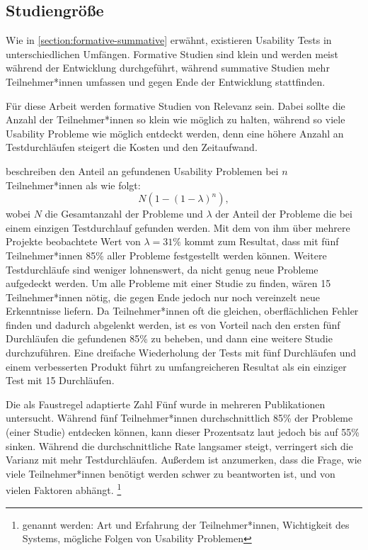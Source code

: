 \subsection{Studiengröße}
\label{section:study-size}

Wie in \ref{section:formative-summative} erwähnt, existieren Usability Tests in unterschiedlichen
Umfängen. Formative Studien sind klein und werden meist während der Entwicklung durchgeführt,
während summative Studien mehr Teilnehmer*innen umfassen und gegen Ende der Entwicklung stattfinden.

Für diese Arbeit werden formative Studien von Relevanz sein. Dabei sollte die Anzahl der
Teilnehmer*innen so klein wie möglich zu halten, während so viele Usability Probleme wie möglich
entdeckt werden, denn eine höhere Anzahl an Testdurchläufen steigert die Kosten und den Zeitaufwand.
\parencites{faulknerFiveuserAssumption2003, nielsenWhyYou2000}

\textcite{nielsenMathematicalModel1993} beschreiben den Anteil an gefundenen Usability Problemen bei
$n$ Teilnehmer*innen als wie folgt:
\begin{equation}
  \label{equation:finding-usability-problems}
  N(1-(1-\lambda{})^n),
\end{equation}
wobei $N$ die Gesamtanzahl der Probleme und $\lambda{}$ der Anteil der Probleme die bei einem
einzigen Testdurchlauf gefunden werden. Mit dem von ihm über mehrere Projekte beobachtete Wert von
$\lambda{}=31\%$ kommt \textcite{nielsenWhyYou2000} zum Resultat, dass mit fünf Teilnehmer*innen
85\% aller Probleme festgestellt werden können. \cite{nielsenWhyYou2000} Weitere Testdurchläufe sind
weniger lohnenswert, da nicht genug neue Probleme aufgedeckt werden. Um alle Probleme mit einer
Studie zu finden, wären 15 Teilnehmer*innen nötig, die gegen Ende jedoch nur noch vereinzelt neue
Erkenntnisse liefern. Da Teilnehmer*innen oft die gleichen, oberflächlichen Fehler finden und
dadurch abgelenkt werden, ist es von Vorteil nach den ersten fünf Durchläufen die gefundenen 85\% zu
beheben, und dann eine weitere Studie durchzuführen. Eine dreifache Wiederholung der Tests mit fünf
Durchläufen und einem verbesserten Produkt führt zu umfangreicheren Resultat als ein einziger Test
mit 15 Durchläufen.
\parencite{nielsenWhyYou2000}

Die als Faustregel adaptierte Zahl Fünf wurde in mehreren Publikationen untersucht. Während fünf
Teilnehmer*innen durchschnittlich 85\% der Probleme (einer Studie) entdecken können, kann dieser
Prozentsatz laut \textcite{faulknerFiveuserAssumption2003} jedoch bis auf 55\% sinken. Während die
durchschnittliche Rate langsamer steigt, verringert sich die Varianz mit mehr Testdurchläufen.
Außerdem ist anzumerken, dass die Frage, wie viele Teilnehmer*innen benötigt werden schwer zu
beantworten ist, und von vielen Faktoren abhängt. \footnote{genannt werden: Art und Erfahrung der
Teilnehmer*innen, Wichtigkeit des Systems, mögliche Folgen von Usability Problemen}
\parencite{faulknerFiveuserAssumption2003}

